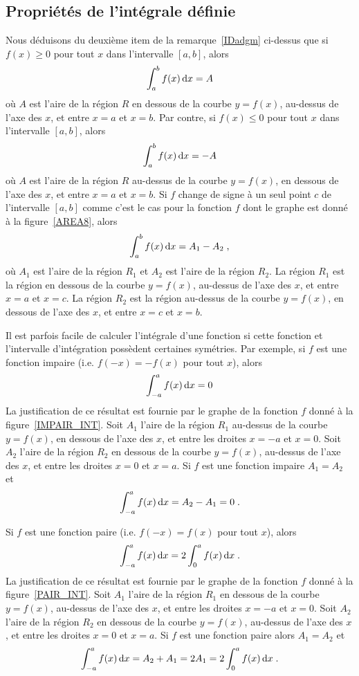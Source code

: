 {\subsection{Propriétés de l'intégrale définie}

Nous déduisons du deuxième item de la remarque~\ref{IDadgm} ci-dessus que
si $f(x)\geq 0$ pour tout $x$ dans l'intervalle $[a,b]$, alors
\[
\displaystyle \int_a^b f(x)\,\mathrm{d}x = A
\]
où $A$ est l'aire de la région $R$ en dessous de la courbe $y=f(x)$,
au-dessus de l'axe des $x$, et entre $x=a$ et $x=b$.  Par contre, si
$f(x)\leq 0$ pour tout $x$ dans l'intervalle $[a,b]$, alors 
\[
\displaystyle \int_a^b f(x)\,\mathrm{d}x = -A
\]
où $A$ est l'aire de la région $R$ au-dessus de la courbe $y=f(x)$,
en dessous de l'axe des $x$, et entre $x=a$ et $x=b$.  Si $f$ change
de signe à un seul point $c$ de l'intervalle $[a,b]$ comme c'est le
cas pour la fonction $f$ dont le graphe est donné à la
figure~\ref{AREA8}, alors
\[
\displaystyle \int_a^b f(x)\,\mathrm{d}x = A_1 - A_2 \; ,
\]
où $A_1$ est l'aire de la région $R_1$ et $A_2$ est l'aire de la
région $R_2$.  La région $R_1$ est la région en dessous de la courbe
$y=f(x)$, au-dessus de l'axe des $x$, et entre $x=a$ et $x=c$.
La région $R_2$ est la région au-dessus de la courbe $y=f(x)$,
en dessous de l'axe des $x$, et entre $x=c$ et $x=b$.


Il est parfois facile de calculer l'intégrale d'une fonction si cette
fonction et l'intervalle d'intégration possèdent certaines symétries.
Par exemple, si $f$ est une fonction impaire (i.e. $f(-x) = -f(x)$
pour tout $x$), alors
\[
\int_{-a}^a f(x) \,\mathrm{d}x = 0
\]
La justification de ce résultat est fournie par le graphe de la
fonction $f$ donné à la figure~\ref{IMPAIR_INT}.  Soit $A_1$ l'aire de la
région $R_1$ au-dessus de la courbe $y=f(x)$, en dessous de l'axe des
$x$, et entre les droites $x=-a$ et $x=0$.  Soit $A_2$ l'aire de la
région $R_2$ en dessous de la courbe $y=f(x)$, au-dessus de l'axe des
$x$, et entre les droites $x=0$ et $x=a$.  Si $f$ est une fonction
impaire $A_1 = A_2$ et
\[
\int_{-a}^a f(x)  \,\mathrm{d}x = A_2 - A_1 = 0 \; .
\]

Si $f$ est une fonction paire (i.e. $f(-x) = f(x)$ pour tout $x$),
alors
\[
\int_{-a}^a f(x) \,\mathrm{d}x = 2 \int_0^a f(x) \,\mathrm{d}x \; .
\]
La justification de ce résultat est fournie par le graphe de la
fonction $f$ donné à la figure~\ref{PAIR_INT}.  Soit $A_1$ l'aire de
la région $R_1$ en dessous
de la courbe $y=f(x)$, au-dessus de l'axe des $x$, et entre les
droites $x=-a$ et $x=0$.  Soit $A_2$ l'aire de la région $R_2$
en dessous de la courbe $y=f(x)$, au-dessus de l'axe des $x$, et entre
les droites $x=0$ et $x=a$.  Si $f$ est une fonction paire alors
$A_1 = A_2$ et 
\[
\int_{-a}^a f(x)  \,\mathrm{d}x = A_2 + A_1 = 2A_1 = 2 \int_0^a f(x)\,\mathrm{d}x \; .
\]

}
